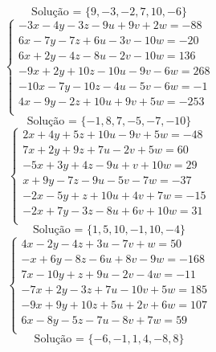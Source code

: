 \documentclass[12pt,oneside,a4paper]{article}
\begin{document}
\begin{equation*}
\text{Solução = }\{9,-3,-2,7,10,-6\}
\end{equation*}
\vspace{\baselineskip}
\begin{equation*}
\begin{cases}
-3x-4y-3z-9u+9v+2w=-88 \\
6x-7y-7z+6u-3v-10w=-20 \\
6x+2y-4z-8u-2v-10w=136 \\
-9x+2y+10z-10u-9v-6w=268 \\
-10x-7y-10z-4u-5v-6w=-1 \\
4x-9y-2z+10u+9v+5w=-253 \\
\end{cases}
\end{equation*}
\begin{equation*}
\text{Solução = }\{-1,8,7,-5,-7,-10\}
\end{equation*}
\vspace{\baselineskip}
\begin{equation*}
\begin{cases}
2x+4y+5z+10u-9v+5w=-48 \\
7x+2y+9z+7u-2v+5w=60 \\
-5x+3y+4z-9u+v+10w=29 \\
x+9y-7z-9u-5v-7w=-37 \\
-2x-5y+z+10u+4v+7w=-15 \\
-2x+7y-3z-8u+6v+10w=31 \\
\end{cases}
\end{equation*}
\begin{equation*}
\text{Solução = }\{1,5,10,-1,10,-4\}
\end{equation*}
\vspace{\baselineskip}
\begin{equation*}
\begin{cases}
4x-2y-4z+3u-7v+w=50 \\
-x+6y-8z-6u+8v-9w=-168 \\
7x-10y+z+9u-2v-4w=-11 \\
-7x+2y-3z+7u-10v+5w=185 \\
-9x+9y+10z+5u+2v+6w=107 \\
6x-8y-5z-7u-8v+7w=59 \\
\end{cases}
\end{equation*}
\begin{equation*}
\text{Solução = }\{-6,-1,1,4,-8,8\}
\end{equation*}
\end{document}
